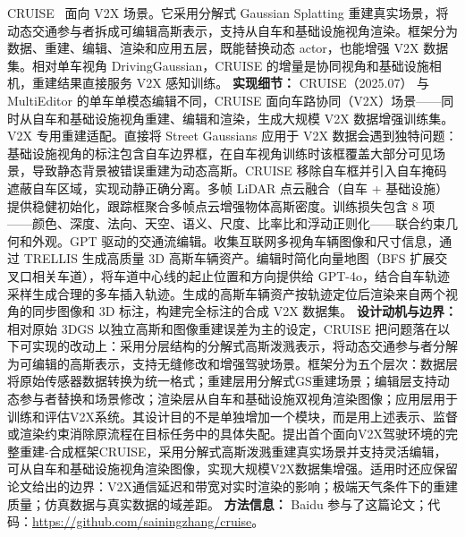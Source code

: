 CRUISE~\cite{2507_18473} 面向 V2X 场景。它采用分解式 Gaussian Splatting 重建真实场景，将动态交通参与者拆成可编辑高斯表示，支持从自车和基础设施视角渲染。框架分为数据、重建、编辑、渲染和应用五层，既能替换动态 actor，也能增强 V2X 数据集。相对单车视角 DrivingGaussian，CRUISE 的增量是协同视角和基础设施相机，重建结果直接服务 V2X 感知训练。
\textbf{实现细节：} CRUISE（2025.07） 与 MultiEditor 的单车单模态编辑不同，CRUISE 面向车路协同（V2X）场景——同时从自车和基础设施视角重建、编辑和渲染，生成大规模 V2X 数据增强训练集。V2X 专用重建适配。直接将 Street Gaussians 应用于 V2X 数据会遇到独特问题：基础设施视角的标注包含自车边界框，在自车视角训练时该框覆盖大部分可见场景，导致静态背景被错误重建为动态高斯。CRUISE 移除自车框并引入自车掩码遮蔽自车区域，实现动静正确分离。多帧 LiDAR 点云融合（自车 + 基础设施）提供稳健初始化，跟踪框聚合多帧点云增强物体高斯密度。训练损失包含 8 项——颜色、深度、法向、天空、语义、尺度、比率比和浮动正则化——联合约束几何和外观。GPT 驱动的交通流编辑。收集互联网多视角车辆图像和尺寸信息，通过 TRELLIS 生成高质量 3D 高斯车辆资产。编辑时简化向量地图（BFS 扩展交叉口相关车道），将车道中心线的起止位置和方向提供给 GPT-4o，结合自车轨迹采样生成合理的多车插入轨迹。生成的高斯车辆资产按轨迹定位后渲染来自两个视角的同步图像和 3D 标注，构建完全标注的合成 V2X 数据集。
\textbf{设计动机与边界：} 相对原始 3DGS 以独立高斯和图像重建误差为主的设定，CRUISE 把问题落在以下可实现的改动上：采用分层结构的分解式高斯泼溅表示，将动态交通参与者分解为可编辑的高斯表示，支持无缝修改和增强驾驶场景。框架分为五个层次：数据层将原始传感器数据转换为统一格式；重建层用分解式GS重建场景；编辑层支持动态参与者替换和场景修改；渲染层从自车和基础设施双视角渲染图像；应用层用于训练和评估V2X系统。其设计目的不是单独增加一个模块，而是用上述表示、监督或渲染约束消除原流程在目标任务中的具体失配。提出首个面向V2X驾驶环境的完整重建-合成框架CRUISE，采用分解式高斯泼溅重建真实场景并支持灵活编辑，可从自车和基础设施视角渲染图像，实现大规模V2X数据集增强。适用时还应保留论文给出的边界：V2X通信延迟和带宽对实时渲染的影响；极端天气条件下的重建质量；仿真数据与真实数据的域差距。
\textbf{方法信息：} Baidu 参与了这篇论文；代码：\url{https://github.com/sainingzhang/cruise}。



